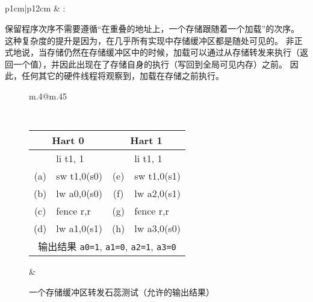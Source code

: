 \subsection{}
\label{sec:memory:loadvalueaxiom}
\begin{tabular}{p{1cm}|p{12cm}} &
: \loadvalueaxiom
\end{tabular}

保留程序次序不需要遵循“在重叠的地址上，一个存储跟随着一个加载”的次序。
这种复杂度的提升是因为，在几乎所有实现中存储缓冲区都是随处可见的。
非正式地说，当存储仍然在存储缓冲区中的时候，加载可以通过从存储转发来执行（返回一个值），并因此出现在了存储自身的执行（写回到全局可见内存）之前。
因此，任何其它的硬件线程将观察到，加载在存储之前执行。

\begin{figure}[h!]
  \centering
  \begin{tabular}{m{.4\linewidth}@{\qquad}m{.45\linewidth}}
  {
    \tt\small
    \begin{tabular}{cl||cl}
    \multicolumn{2}{c}{Hart 0} & \multicolumn{2}{c}{Hart 1} \\
    \hline
          & li t1, 1    &     & li t1, 1    \\
      (a) & sw t1,0(s0) & (e) & sw t1,0(s1) \\
      (b) & lw a0,0(s0) & (f) & lw a2,0(s1) \\
      (c) & fence r,r   & (g) & fence r,r   \\
      (d) & lw a1,0(s1) & (h) & lw a3,0(s0) \\
      \hline
      \multicolumn{4}{c}{输出结果 {\tt a0=1}, {\tt a1=0}, {\tt a2=1}, {\tt a3=0}}
    \end{tabular}
  }
  &
  
  \end{tabular}
  \caption{一个存储缓冲区转发石蕊测试（允许的输出结果）
    }
  \label{fig:litmus:storebuffer}
\end{figure}

